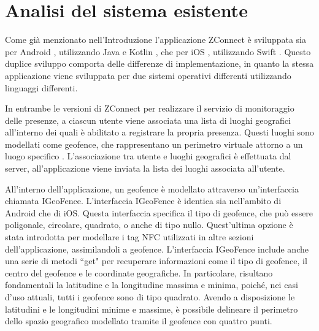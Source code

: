 \section{Analisi del sistema esistente}\label{Analisi_sistema}

Come già menzionato nell'Introduzione l'applicazione ZConnect è sviluppata sia per Android \cite{Android}, utilizzando Java \cite{Java} e Kotlin \cite{Kotlin}, che per iOS \cite{iOS}, utilizzando Swift \cite{Swift}. Questo duplice sviluppo comporta delle differenze di implementazione, in quanto la stessa applicazione viene sviluppata per due sistemi operativi differenti utilizzando linguaggi differenti.

In entrambe le versioni di ZConnect per realizzare il servizio di monitoraggio delle presenze, a ciascun utente viene associata una lista di luoghi geografici all'interno dei quali è abilitato a registrare la propria presenza. Questi luoghi sono modellati come geofence, che rappresentano un perimetro virtuale attorno a un luogo specifico \cite{GeoFence}. L'associazione tra utente e luoghi geografici è effettuata dal server, all'applicazione viene inviata la lista dei luoghi associata all'utente.

All'interno dell'applicazione, un geofence è modellato attraverso un'interfaccia chiamata IGeoFence. L'interfaccia IGeoFence è identica sia nell'ambito di Android che di iOS. Questa interfaccia specifica il tipo di geofence, che può essere poligonale, circolare, quadrato, o anche di tipo nullo. Quest'ultima opzione è stata introdotta per modellare i tag NFC utilizzati in altre sezioni dell'applicazione, assimilandoli a geofence. L'interfaccia IGeoFence include anche una serie di metodi ``get" per recuperare informazioni come il tipo di geofence, il centro del geofence e le coordinate geografiche. In particolare, risultano fondamentali la latitudine e la longitudine massima e minima, poiché, nei casi d'uso attuali, tutti i geofence sono di tipo quadrato. Avendo a disposizione le latitudini e le longitudini minime e massime, è possibile delineare il perimetro dello spazio geografico modellato tramite il geofence con quattro punti.

